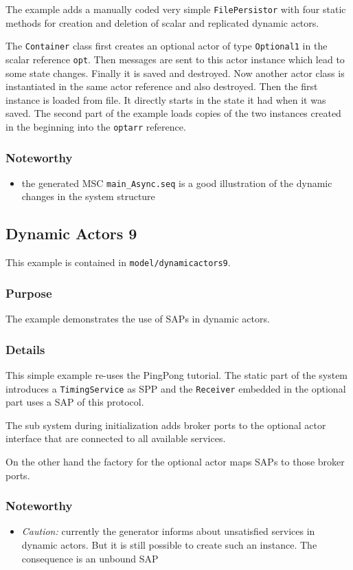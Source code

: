 The example adds a manually coded very simple \texttt{FilePersistor} with four static methods for creation and deletion of scalar and replicated
dynamic actors.

The \texttt{Container} class first creates an optional actor of type \texttt{Optional1} in the scalar reference \texttt{opt}.
Then messages are sent to this actor instance which lead to some state changes. Finally it is saved and destroyed.
Now another actor class is instantiated in the same actor reference and also destroyed. Then the first instance is loaded from file.
It directly starts in the state it had when it was saved. The second part of the example loads copies of the two
instances created in the beginning into the \texttt{optarr} reference.

\subsubsection{Noteworthy}

\begin{itemize}
\item the generated MSC \texttt{main\_Async.seq} is a good illustration of the dynamic changes in the system structure
\end{itemize}

\subsection{Dynamic Actors 9}

This example is contained in \texttt{model/dynamicactors9}.

\subsubsection{Purpose}

The example demonstrates the use of SAPs in dynamic actors.

\subsubsection{Details}

This simple example re-uses the PingPong tutorial. The static part of the system introduces a \texttt{TimingService} as SPP
and the \texttt{Receiver} embedded in the optional part uses a SAP of this protocol.

The sub system during initialization adds broker ports to the optional actor interface that are connected to all available
services.

On the other hand the factory for the optional actor maps SAPs to those broker ports.

\subsubsection{Noteworthy}

\begin{itemize}
\item \emph{Caution:} currently the generator informs about unsatisfied services in dynamic actors. But it is still possible to create such an
instance. The consequence is an unbound SAP
\end{itemize}
